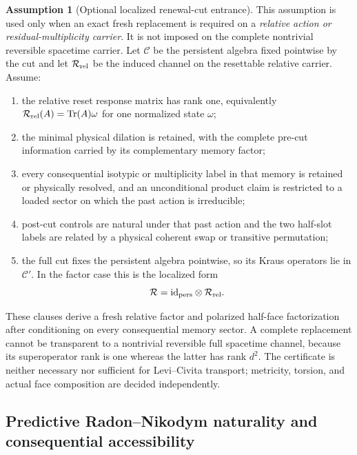 \documentclass[11pt]{article}
\theoremstyle{definition}
\newtheorem{assumption}[theorem]{Assumption}
\theoremstyle{remark}
\newcommand{\id}{\mathrm{id}}
\newcommand{\Tr}{\operatorname{Tr}}
\begin{document}
\begin{assumption}[Optional localized renewal-cut entrance]
\label{ass:complete-cut-entry}
This assumption is used only when an exact fresh replacement is required on a
\emph{relative action or residual-multiplicity carrier}.  It is not imposed on
the complete nontrivial reversible spacetime carrier.  Let \(\mathcal C\) be
the persistent algebra fixed pointwise by the cut and let
\(\mathcal R_{\rm rel}\) be the induced channel on the resettable relative
carrier.  Assume:
\begin{enumerate}[label=\textup{(F\arabic*)},leftmargin=3em]
\item the relative reset response matrix has rank one, equivalently
      \(\mathcal R_{\rm rel}(A)=\Tr(A)\omega\) for one normalized state
      \(\omega\);
\item the minimal physical dilation is retained, with the complete pre-cut
      information carried by its complementary memory factor;
\item every consequential isotypic or multiplicity label in that memory is
      retained or physically resolved, and an unconditional product claim is
      restricted to a loaded sector on which the past action is irreducible;
\item post-cut controls are natural under that past action and the two half-slot
      labels are related by a physical coherent swap or transitive permutation;
\item the full cut fixes the persistent algebra pointwise, so its Kraus
      operators lie in \(\mathcal C'\).  In the factor case this is the
      localized form
      \[
        \mathcal R=\id_{\rm pers}\otimes\mathcal R_{\rm rel}.
      \]
\end{enumerate}
These clauses derive a fresh relative factor and polarized half-face
factorization after conditioning on every consequential memory sector.  A
complete replacement cannot be transparent to a nontrivial reversible full
spacetime channel, because its superoperator rank is one whereas the latter has
rank \(d^2\).  The certificate is neither necessary nor sufficient for
Levi--Civita transport; metricity, torsion, and actual face composition are
decided independently.
\end{assumption}

\subsection{Predictive Radon--Nikodym naturality and consequential accessibility}
\end{document}
